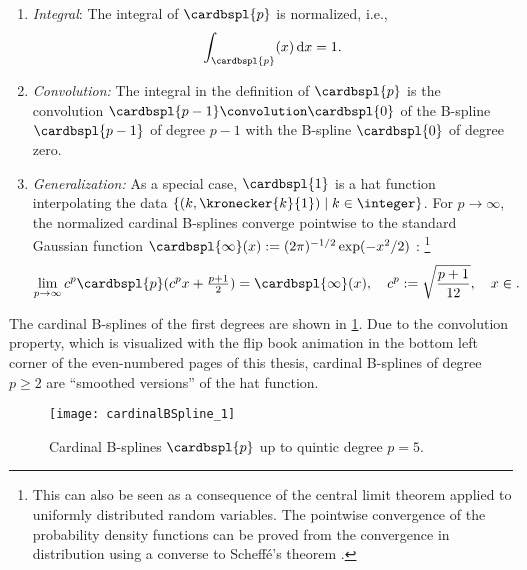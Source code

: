 \begin{enumerate}
  \item
  \emph{Integral}:
  The integral of $\cardbspl{p}$ is normalized, i.e.,
  \begin{equation}
    \int_\real \cardbspl{p}(x) \dx = 1.
  \end{equation}
  
  \item
  \emph{Convolution:}
  The integral in the definition of $\cardbspl{p}$
  is the convolution $\cardbspl{p-1} \convolution \cardbspl{0}$
  of the B-spline $\cardbspl{p-1}$
  of degree $p - 1$ with the B-spline $\cardbspl{0}$ of degree zero.
  
  \item
  \emph{Generalization:}
  As a special case, $\cardbspl{1}$ is a hat function interpolating the data
  $\{(k, \kronecker{k}{1}) \mid k \in \integer\}$.
  For $p \to \infty$, the normalized cardinal B-splines converge
  pointwise to the standard Gaussian function
  $\cardbspl{\infty}(x) := (2\pi)^{-1/2} \exp(-x^2/2)$ \cite{Unser92Asymptotic}:%
  \footnote{%
    This can also be seen as a consequence of the central limit theorem
    applied to uniformly distributed random variables.
    The pointwise convergence of the probability density functions
    can be proved from the convergence
    in distribution using a converse to Scheffé's theorem
    \cite{Boos85Converse}.%
  }
  \begin{equation}
    \lim_{p \to \infty}
    c^p \cardbspl{p}(c^p x + \tfrac{p+1}{2})
    = \cardbspl{\infty}(x),\quad
    c^p := \sqrt{\frac{p+1}{12}},\quad
    x \in \real.
  \end{equation}
\end{enumerate}
The cardinal B-splines of the first degrees are shown in
\cref{fig:cardinalBSpline}.
Due to the convolution property,
which is visualized with the flip book animation in the bottom left corner
of the even-numbered pages of this thesis,
cardinal B-splines of degree $p \ge 2$ are ``smoothed versions''
of the hat function.

\begin{figure}
  \texttt{[image: cardinalBSpline\_1]}%
  \caption{Cardinal B-splines $\cardbspl{p}$ up to quintic degree $p = 5$.}%
  \label{fig:cardinalBSpline}
\end{figure}

